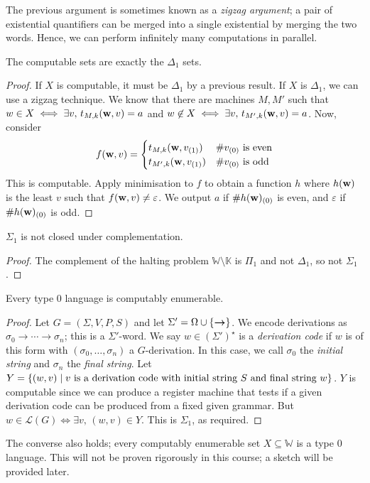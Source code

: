 \begin{remark}
	The previous argument is sometimes known as a \emph{zigzag argument}; a pair of existential quantifiers can be merged into a single existential by merging the two words.
	Hence, we can perform infinitely many computations in parallel.
\end{remark}
\begin{corollary}
	The computable sets are exactly the \( \Delta_1 \) sets.
\end{corollary}
\begin{proof}
	If \( X \) is computable, it must be \( \Delta_1 \) by a previous result.
	If \( X \) is \( \Delta_1 \), we can use a zigzag technique.
	We know that there are machines \( M, M' \) such that \( w \in X \iff \exists v,\, t_{M,k}(\vb w, v) = a \) and \( w \not\in X \iff \exists v,\, t_{M',k}(\vb w, v) = a \).
	Now, consider
	\[ f(\vb w, v) = \begin{cases}
		t_{M,k}(\vb w, v_{(1)}) & \#v_{(0)} \text{ is even} \\
		t_{M',k}(\vb w, v_{(1)}) & \#v_{(0)} \text{ is odd}
	\end{cases} \]
	This is computable.
	Apply minimisation to \( f \) to obtain a function \( h \) where \( h(\vb w) \) is the least \( v \) such that \( f(\vb w, v) \neq \varepsilon \).
	We output \( a \) if \( \#h(\vb w)_{(0)} \) is even, and \( \varepsilon \) if \( \#h(\vb w)_{(0)} \) is odd.
\end{proof}
\begin{corollary}
	\( \Sigma_1 \) is not closed under complementation.
\end{corollary}
\begin{proof}
	The complement of the halting problem \( \mathbb W \setminus \mathbb K \) is \( \Pi_1 \) and not \( \Delta_1 \), so not \( \Sigma_1 \).
\end{proof}
\begin{theorem}
	Every type 0 language is computably enumerable.
\end{theorem}
\begin{proof}
	Let \( G = (\Sigma, V, P, S) \) and let \( \Sigma' = \Omega \cup \qty{\bm\to} \).
	We encode derivations as \( \sigma_0 \bm\to \cdots \bm\to \sigma_n \); this is a \( \Sigma' \)-word.
	We say \( w \in (\Sigma')^\star \) is a \emph{derivation code} if \( w \) is of this form with \( (\sigma_0, \dots, \sigma_n) \) a \( G \)-derivation.
	In this case, we call \( \sigma_0 \) the \emph{initial string} and \( \sigma_n \) the \emph{final string}.
	Let \( Y = \qty{(w, v) \mid v \text{ is a derivation code with initial string } S \text{ and final string } w} \).
	\( Y \) is computable since we can produce a register machine that tests if a given derivation code can be produced from a fixed given grammar.
	But \( w \in \mathcal L(G) \iff \exists v,\, (w, v) \in Y \).
	This is \( \Sigma_1 \), as required.
\end{proof}
\begin{remark}
	The converse also holds; every computably enumerable set \( X \subseteq \mathbb W \) is a type 0 language.
	This will not be proven rigorously in this course; a sketch will be provided later.
\end{remark}

